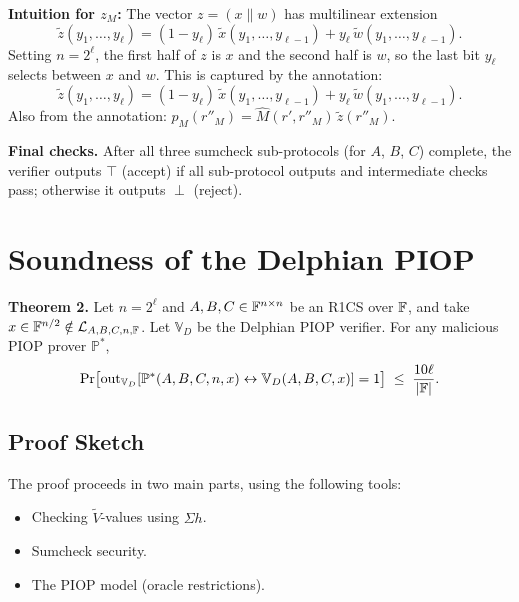 \documentclass[11pt]{article}
\newcommand{\tildew}{\tilde{w}}
\newcommand{\tildex}{\tilde{x}}
\begin{document}
\begin{importantbox}
  \textbf{Intuition for $z_M$:} The vector $z = (x \| w)$ has multilinear extension
  \[
    \tilde{z}(y_1, \ldots, y_\ell)
    = (1 - y_\ell)\,\tildex(y_1,\ldots,y_{\ell-1})
      + y_\ell\,\tildew(y_1,\ldots,y_{\ell-1}).
  \]
  Setting $n = 2^\ell$, the first half of $z$ is $x$ and the second half is $w$, so the
  last bit $y_\ell$ selects between $x$ and $w$.  This is captured by the annotation:
  \[
    \tilde{z}(y_1,\ldots,y_\ell)
    = (1-y_\ell)\,\tildex(y_1,\ldots,y_{\ell-1})
      + y_\ell\,\tildew(y_1,\ldots,y_{\ell-1}).
  \]
  Also from the annotation: $p_M(r''_M) = \widehat{M}(r', r''_M)\,\tilde{z}(r''_M)$.
\end{importantbox}

\medskip
\noindent\textbf{Final checks.}  After all three sumcheck sub-protocols (for $A$, $B$, $C$)
complete, the verifier outputs $\top$ (accept) if all sub-protocol outputs and intermediate
checks pass; otherwise it outputs $\perp$ (reject).

\section{Soundness of the Delphian PIOP}

\begin{theorembox}
  \textbf{Theorem 2.}  Let $n = 2^\ell$ and $A, B, C \in \mathbb{F}^{n \times n}$ be an R1CS over
  $\mathbb{F}$, and take $x \in \mathbb{F}^{n/2} \notin \mathcal{L}_{A,B,C,n,\mathbb{F}}$.  Let $\mathbb{V}_D$ be
  the Delphian PIOP verifier.  For any malicious PIOP prover $\mathbb{P}^*$,
  \[
    \Pr\bigl[\text{out}_{\mathbb{V}_D}[\mathbb{P}^*(A,B,C,n,x)
    \leftrightarrow \mathbb{V}_D(A,B,C,x)] = 1\bigr]
    \;\leq\; \frac{10\ell}{|\mathbb{F}|}.
  \]
\end{theorembox}

\subsection{Proof Sketch}

The proof proceeds in two main parts, using the following tools:
\begin{itemize}
  \item Checking $\tilde{V}$-values using $\Sigma h$.
  \item Sumcheck security.
  \item The PIOP model (oracle restrictions).
\end{itemize}
\end{document}
